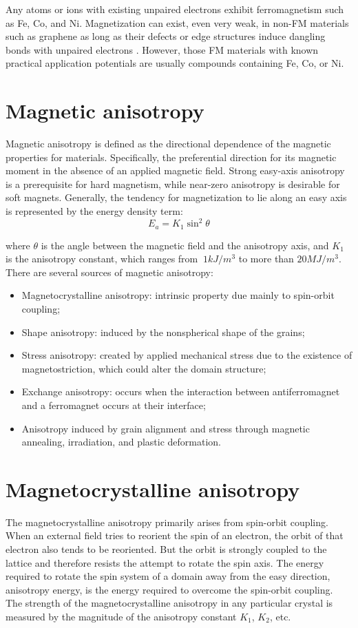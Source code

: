 Any atoms or ions with existing unpaired electrons exhibit ferromagnetism such as Fe, Co, and Ni. Magnetization can exist, even very weak, in non-FM materials such as graphene as long as their defects or edge structures induce dangling bonds with unpaired electrons \cite{Ma:2012aa, Liu:2013aa}. However, those FM materials with known practical application potentials are usually compounds containing Fe, Co, or Ni.

\section{Magnetic anisotropy}
Magnetic anisotropy is defined as the directional dependence of the magnetic
properties for materials. Specifically, the preferential direction for its magnetic moment in the absence of an applied magnetic field. Strong easy-axis anisotropy is a prerequisite for hard magnetism, while near-zero anisotropy is desirable for soft magnets.
Generally, the tendency for magnetization to lie along an easy axis is represented by the energy
density term:
\begin{equation}
E_a = K_1 \sin^2 \theta
\end{equation}

where $\theta$ is the angle between the magnetic field and the anisotropy axis, and $K_1$ is the
anisotropy constant, which ranges from $~1 kJ/m^3$ to more than $20 MJ/m^3$.  There are
several sources of magnetic anisotropy:
\begin{itemize}
\item Magnetocrystalline anisotropy: intrinsic property due mainly to spin-orbit coupling;
\item Shape anisotropy: induced by the nonspherical shape of the grains; 
\item Stress anisotropy: created by applied mechanical stress due to the existence of magnetostriction, which could alter the domain structure;
\item Exchange anisotropy: occurs when the interaction between antiferromagnet and a ferromagnet occurs at their interface;
\item Anisotropy induced by grain alignment and stress through magnetic
annealing, irradiation, and plastic deformation.

\end{itemize}

\section{Magnetocrystalline anisotropy}
The magnetocrystalline anisotropy primarily arises from spin-orbit coupling.
When an external field tries to reorient the spin of an electron, the orbit of that electron
also tends to be reoriented. But the orbit is strongly coupled to the lattice and therefore
resists the attempt to rotate the spin axis. The energy required to rotate the spin system of
a domain away from the easy direction, anisotropy energy, is the energy required to
overcome the spin-orbit coupling. The strength of the magnetocrystalline anisotropy in
any particular crystal is measured by the magnitude of the anisotropy constant $K_1$, $K_2$, etc.

